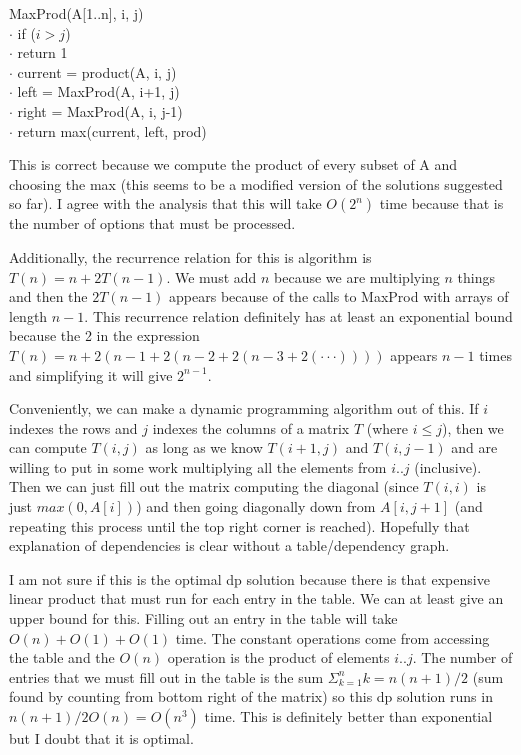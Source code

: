 \documentclass{article}
\begin{document}
\begin{enumerate}
        \begin{algorithm}
            MaxProd(A[1..n], i, j) \\
            $\cdot$ \hspace{1em} if ($i > j$) \\
            $\cdot$ \hspace{2em} return 1 \\
            $\cdot$ \hspace{1em} current = product(A, i, j) \\
            $\cdot$ \hspace{1em} left    = MaxProd(A, i+1, j) \\
            $\cdot$ \hspace{1em} right   = MaxProd(A, i, j-1) \\
            $\cdot$ \hspace{1em} return max(current, left, prod)
        \end{algorithm}

        This is correct because we compute the product of every subset of A and choosing the max (this seems to be a modified version of the solutions suggested so far). I agree with the analysis that this will take $O (2^n)$ time because that is the number of options that must be processed.

        Additionally, the recurrence relation for this is algorithm is $T(n) = n + 2T(n-1)$. We must add $n$ because we are multiplying $n$ things and then the $2T(n-1)$ appears because of the calls to MaxProd with arrays of length $n-1$. This recurrence relation definitely has at least an exponential bound because the 2 in the expression $T(n) = n + 2(n-1+2(n-2+2(n-3 + 2(\cdot \cdot \cdot))))$ appears $n-1$ times and simplifying it will give $2^{n-1}$.

        Conveniently, we can make a dynamic programming algorithm out of this. If $i$ indexes the rows and $j$ indexes the columns of a matrix $T$ (where $i \leq j$), then we can compute $T(i, j)$ as long as we know $T(i+1, j)$ and $T(i, j-1)$ and are willing to put in some work multiplying all the elements from $i..j$ (inclusive). Then we can just fill out the matrix computing the diagonal (since $T(i, i)$ is just $max (0, A[i])$) and then going diagonally down from $A[i, j+1]$ (and repeating this process until the top right corner is reached). Hopefully that explanation of dependencies is clear without a table/dependency graph.

        I am not sure if this is the optimal dp solution because there is that expensive linear product that must run for each entry in the table. We can at least give an upper bound for this. Filling out an entry in the table will take $O (n) + O(1) + O(1)$ time. The constant operations come from accessing the table and the $O(n)$ operation is the product of elements $i..j$. The number of entries that we must fill out in the table is the sum $\Sigma _{k=1}^n k = n(n+1)/2$ (sum found by counting from bottom right of the matrix) so this dp solution runs in $n(n+1)/2 O (n) = O(n^3)$ time. This is definitely better than exponential but I doubt that it is optimal.
\end{enumerate}
\end{document}
